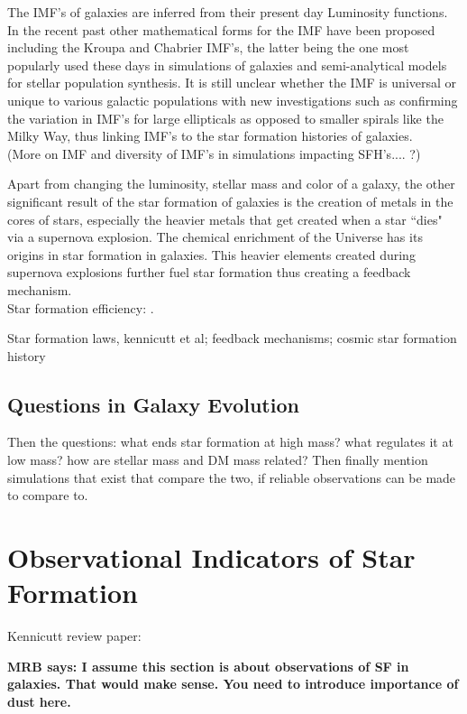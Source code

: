 The IMF's of galaxies are inferred from their present day Luminosity functions. In the recent past other mathematical forms for the IMF have been proposed including the Kroupa \citep{2001MNRAS.322..231K} and Chabrier \citep{2003PASP..115..763C} IMF's, the latter being the one most popularly used these days in simulations of galaxies and semi-analytical models for stellar population synthesis. It is still unclear whether the IMF is universal or unique to various galactic populations with  new investigations such as\citet{2012Natur.484..485C} confirming the variation in IMF's for large ellipticals as opposed to smaller spirals like the Milky Way, thus linking IMF's to the star formation histories of galaxies.\\

(More on IMF and diversity of IMF's in simulations impacting SFH's.... ?)

Apart from changing the luminosity, stellar mass and color of a galaxy, the other significant result of the star formation of galaxies is the creation of metals in the cores of stars, especially the heavier metals that get created when a star ``dies" via a supernova explosion. The chemical enrichment of the Universe has its origins in star formation in galaxies. This heavier elements created during supernova explosions further fuel star formation thus creating a feedback mechanism.\\ 


Star formation efficiency: \citep{1538-3881-136-6-2782}.

Star formation laws, kennicutt et al; feedback mechanisms; cosmic star formation history

\subsection{Questions in Galaxy Evolution}
{Then the questions: what ends star formation at high mass?
what  regulates it at low mass? how are 
stellar mass and DM mass related? Then finally mention
simulations that exist that compare the two, if reliable
observations can be made to compare to.}

\section{Observational Indicators of Star Formation}

Kennicutt review paper: 

{\bf MRB says: I assume this section is about observations 
of SF in galaxies. That would make sense. You need to 
introduce importance of dust here.}

